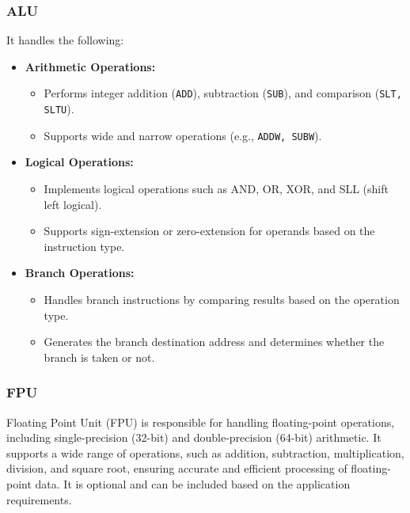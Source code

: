 \documentclass[12pt]{report}
\begin{document}
\subsubsection{ALU}

It handles the following:
\begin{itemize}
    \item \textbf{Arithmetic Operations:}
        \begin{itemize}
            \item Performs integer addition (\texttt{ADD}), subtraction (\texttt{SUB}), and comparison (\texttt{SLT, SLTU}).
            \item Supports wide and narrow operations (e.g., \texttt{ADDW, SUBW}).
        \end{itemize}

    \item \textbf{Logical Operations:}
        \begin{itemize}
            \item Implements logical operations such as AND, OR, XOR, and SLL (shift left logical).
            \item Supports sign-extension or zero-extension for operands based on the instruction type.
        \end{itemize}

    \item \textbf{Branch Operations:}
        \begin{itemize}
            \item Handles branch instructions by comparing results based on the operation type.
            \item Generates the branch destination address and determines whether the branch is taken or not.
        \end{itemize}
\end{itemize}

\subsubsection{FPU}
Floating Point Unit (FPU) is responsible for handling floating-point operations, including single-precision (32-bit) and double-precision (64-bit) arithmetic. It supports a wide range of operations, such as addition, subtraction, multiplication, division, and square root, ensuring accurate and efficient processing of floating-point data. It is optional and can be included based on the application requirements.
\end{document}
